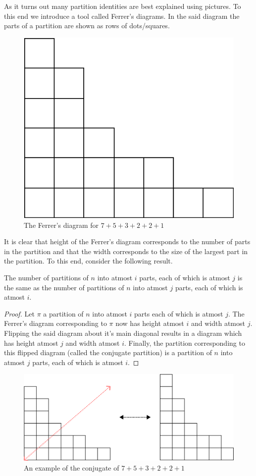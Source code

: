 \par
As it turns out many partition identities are best explained using pictures. To this end we introduce a tool called Ferrer's diagrams. In the said diagram the parts of a partition are shown as rows of dots/squares. 
\begin{figure}[H]
    \centering
    \includegraphics[width=0.5\linewidth]{Images/Figure17.png}
    \caption{The Ferrer's diagram for $7+5+3+2+2+1$}
\end{figure}
It is clear that height of the Ferrer's diagram corresponds to the number of parts in the partition and that the width corresponds to the size of the largest part in the partition. To this end, consider the following result. 
\begin{theorem}
The  number of partitions of $n$ into atmost $i$ parts, each of which is atmost $j$ is the same as the number of partitions of $n$ into atmost $j$ parts, each of which is atmost $i$. 
\end{theorem}
\begin{proof}
Let $\pi$ a partition of $n$ into atmost $i$ parts each of which is atmost $j$. The Ferrer's diagram corresponding to $\pi$ now has height atmost $i$ and width atmost $j$. Flipping the said diagram about it's main diagonal results in a diagram which has height atmost $j$ and width atmost $i$. Finally, the partition corresponding to this flipped diagram (called the conjugate partition) is a partition of $n$ into atmost $j$ parts, each of which is atmost $i$. 
\end{proof}
\begin{figure}[H]
    \centering
    \includegraphics[width=0.8\linewidth]{Images/Figure18.png}
    \caption{An example of the conjugate of $7+5+3+2+2+1$}
\end{figure}
